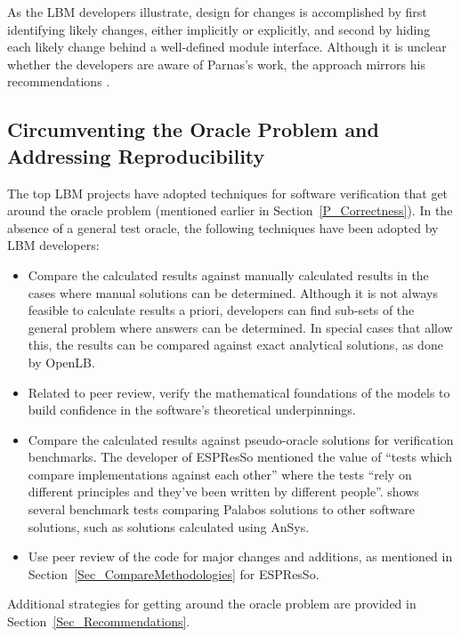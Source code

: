 \documentclass[final, 3p, times, authoryear]{elsarticle}
\begin{document}
As the LBM developers illustrate, design for changes is accomplished by first
identifying likely changes, either implicitly or explicitly, and second by
hiding each likely change behind a well-defined module interface.  Although it
is unclear whether the developers are aware of Parnas's work, the approach
mirrors his recommendations \citep{Parnas1972a}.

\subsection{Circumventing the Oracle Problem and Addressing Reproducibility}
\label{SecReproducibility}

The top LBM projects have adopted techniques for software verification that get
around the oracle problem (mentioned earlier in Section~\ref{P_Correctness}). In
the absence of a general test oracle, the following techniques have been adopted
by LBM developers:

\begin{itemize}
	\item Compare the calculated results against manually calculated results in
	the cases where manual solutions can be determined.  Although it is not
	always feasible to calculate results a priori, developers can find sub-sets
	of the general problem where answers can be determined.  In special cases
	that allow this, the results can be compared against exact analytical
	solutions, as done by OpenLB.
	\item Related to peer review, verify the mathematical foundations of the
	models to build confidence in the software's theoretical underpinnings.
	\item Compare the calculated results against pseudo-oracle solutions for
	verification benchmarks. The developer of ESPResSo mentioned the value of
	``tests which compare implementations against each other'' where the tests
	``rely on different principles and they've been written by different
	people''. \citet{latt2021palabos} shows several benchmark tests comparing
	Palabos solutions to other software solutions, such as solutions calculated
	using AnSys.
	\item Use peer review of the code for major changes and additions, as
	mentioned in Section~\ref{Sec_CompareMethodologies} for ESPResSo. 
\end{itemize}

\noindent Additional strategies for getting around the oracle problem are
provided in Section~\ref{Sec_Recommendations}.
\end{document}
